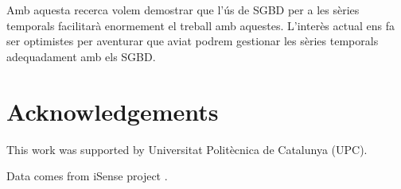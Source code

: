 Amb aquesta recerca volem demostrar que l'ús de SGBD per a les sèries temporals facilitarà enormement el treball amb aquestes.
L'interès actual ens fa ser optimistes per aventurar que aviat podrem gestionar les sèries temporals adequadament amb els SGBD.



\section*{Acknowledgements}

This work was supported by Universitat Polit\`{e}cnica de Catalunya (UPC).

Data comes from iSense project .








